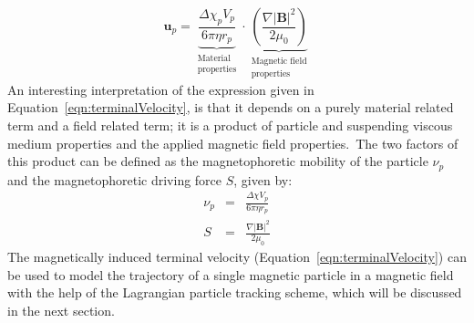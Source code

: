 \begin{equation}
	\mathbf{u}_{p} = \underbrace{\frac{\Delta\chi_{p} V_{p}}{6\pi\eta r_{p}}}_{\begin{smallmatrix}{\text{Material}}\\{\text{properties}}\end{smallmatrix}} \cdot \underbrace{\left(\frac{\nabla |\mathbf{B}|^{2}}{2\mu_{0}}\right)}_{\begin{smallmatrix}{\text{Magnetic field}}\\{\text{properties}}\end{smallmatrix}}
	\label{eqn:terminalVelocity}
\end{equation}
An interesting interpretation of the expression given in Equation~\ref{eqn:terminalVelocity}, is that it depends on a purely material related term and a field related term; it is a product of particle and suspending viscous medium properties and the applied magnetic field properties.\ The two factors of this product can be defined as the magnetophoretic mobility of the particle $\nu_{p}$ and the magnetophoretic driving force $S$, given by:\
\begin{eqnarray}
		\nu_{p} &=& \frac{\Delta \chi V_{p}}{6\pi\eta r_{p}} \label{eqn:magnetophoreticMobility} \\
		S &=& \frac{\nabla |\mathbf{B}|^{2}}{2\mu_{0}} \label{eqn:magnetophoreticDrivingForce}
\end{eqnarray}
The magnetically induced terminal velocity (Equation~\ref{eqn:terminalVelocity}) can be used to model the trajectory of a single magnetic particle in a magnetic field with the help of the Lagrangian particle tracking scheme, which will be discussed in the next section.\
%
